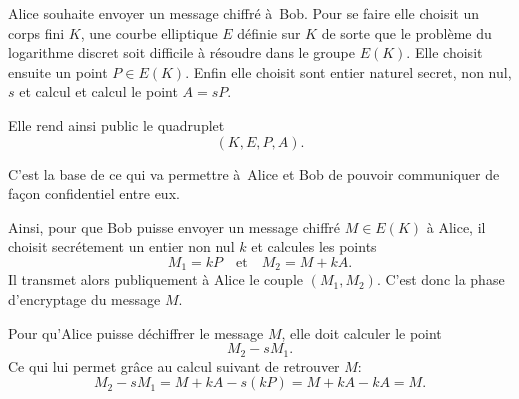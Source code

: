 Alice souhaite envoyer un message chiffré à Bob. Pour se faire elle choisit un corps fini $K$, une courbe elliptique $E$ définie sur $K$ de sorte que le problème du logarithme discret soit difficile à résoudre dans le groupe $E(K)$. Elle choisit ensuite un point $P \in E(K)$. Enfin elle choisit sont entier naturel secret, non nul, $s$ et calcul et calcul le point $A=sP$.

Elle rend ainsi public le quadruplet 
\[
    (K,E,P,A)
.\] 

C'est la base de ce qui va permettre à Alice et Bob de pouvoir communiquer de façon confidentiel entre eux.

Ainsi, pour que Bob puisse envoyer un message chiffré $M \in E(K)$ à Alice, il choisit secrétement un entier non nul $k$ et calcules les points
\[
M_1=kP \quad \text{et} \quad M_2=M+kA
.\] 
Il transmet alors publiquement à Alice le couple $(M_1,M_2)$. C'est donc la phase d'encryptage du message $M$.

Pour qu'Alice puisse déchiffrer le message $M$, elle doit calculer le point
\[
M_2-sM_1
.\] 
Ce qui lui permet grâce au calcul suivant de retrouver $M$:
\[
M_2-sM_1=M+kA-s(kP)=M+kA-kA=M
.\] 
